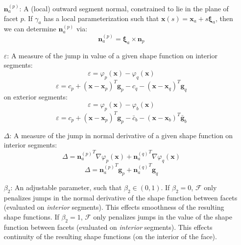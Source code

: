 \documentclass[11pt]{article} %
\begin{document}
\begin{itemize}
	\item[$\mathbf{n}^{(p)}_a$:] A (local) outward segment normal, constrained to lie in the plane of facet $p$. If $\gamma_a$ has a local parameterization such that $\mathbf{x} (s) = \mathbf{x}_a + s \mathbf{\xi}_a$, then we can determine $\mathbf{n}^{(p)}_a$ via:
	\begin{equation}
		\mathbf{n}^{(p)}_a = \mathbf{\xi}_a \times \mathbf{n}_p
	\end{equation}
	\item[$\varepsilon$:] A measure of the jump in value of a given shape function on interior segments:
	\begin{equation}
		\varepsilon = \varphi_p (\mathbf{x}) - \varphi_q (\mathbf{x})
	\end{equation}
	\begin{equation}
		\varepsilon = c_p + (\mathbf{x} - \mathbf{x}_p)^T \mathbf{g}_p - c_q - (\mathbf{x} - \mathbf{x}_q)^T \mathbf{g}_q
	\end{equation}
	on exterior segments:
	\begin{equation}
		\varepsilon = \varphi_p (\mathbf{x}) - \varphi_b (\mathbf{x})
	\end{equation}
	\begin{equation}
		\varepsilon = c_p + (\mathbf{x} - \mathbf{x}_p)^T \mathbf{g}_p - \bar{c}_b - (\mathbf{x} - \mathbf{x}_b)^T \bar{\mathbf{g}}_b
	\end{equation}
	\item[$\Delta$:] A measure of the jump in normal derivative of a given shape function on interior segments:
	\begin{equation}
		\Delta = {\mathbf{n}^{(p)}_a}^T \nabla \varphi_p (\mathbf{x}) + {\mathbf{n}^{(q)}_a}^T \nabla \varphi_q (\mathbf{x})
	\end{equation}
	\begin{equation}
		\Delta = {\mathbf{n}^{(p)}_a}^T \mathbf{g}_p + {\mathbf{n}^{(q)}_a}^T \mathbf{g}_q
	\end{equation}
	\item[$\beta_2$:] An adjustable parameter, such that $\beta_2 \in (0, 1)$. If $\beta_2 = 0$, $\mathcal{F}$ only penalizes jumps in the normal derivative of the shape function between facets (evaluated on \textit{interior} segments). This effects smoothness of the resulting shape functions. If $\beta_2 = 1$, $\mathcal{F}$ only penalizes jumps in the value of the shape function between facets (evaluated on \textit{interior} segments). This effects continuity of the resulting shape functions (on the interior of the face).

\end{itemize}
\end{document}
